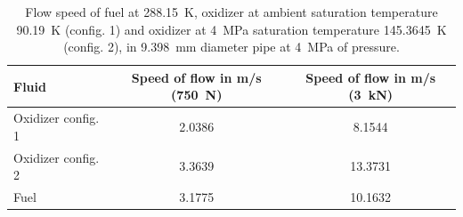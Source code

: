                 \begin{table}[h]
                \centering
                    \begin{tabular}{ |l | c | c|} 
                        \hline
                        Fluid  & Speed of flow in \unit{m/s} (\qty{750}{N}) & Speed of flow in \unit{m/s} (\qty{3}{kN})\\
                        \hline
                        Oxidizer config. 1 & 2.0386 & 8.1544\\
                        \hline
                        Oxidizer config. 2 & 3.3639 & 13.3731\\  
                        \hline
                        Fuel & 3.1775 & 10.1632\\
                        \hline
                    \end{tabular} 
                    \caption{Flow speed of fuel at \qty{288.15}{K}, oxidizer at ambient saturation temperature \qty{90.19}{K} (config. 1) and oxidizer at \qty{4}{MPa} saturation temperature \qty{145.3645}{K} (config. 2), in \qty{9.398}{mm} diameter pipe at \qty{4}{MPa} of pressure.}
                    \label{tab:speed_of_flow}
                \end{table}
                
